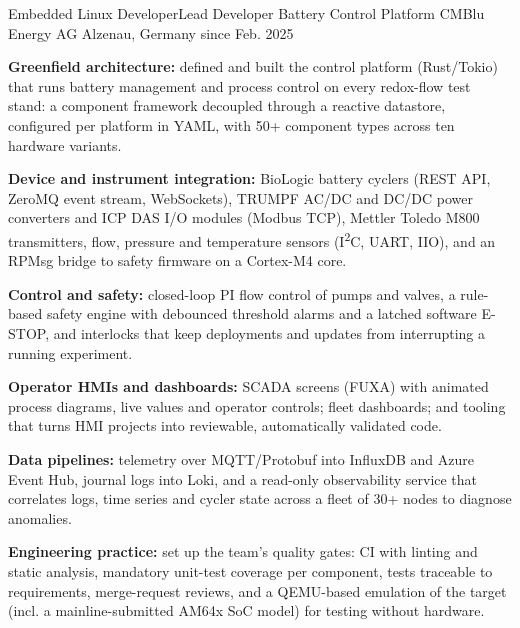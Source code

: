 

\begin{cventries}

  \cventry
    {Embedded Linux Developer{\enskip\cdotp\enskip}Lead Developer Battery Control Platform} %
    {CMBlu Energy AG} %
    {Alzenau, Germany} %
    {since Feb. 2025} %
    {
      \begin{cvitems} %
        \item {\textbf{Greenfield architecture:} defined and built the control platform (Rust/Tokio) that runs battery management and process control on every redox-flow test stand: a component framework decoupled through a reactive datastore, configured per platform in YAML, with 50+ component types across ten hardware variants.}
        \item {\textbf{Device and instrument integration:} BioLogic battery cyclers (REST API, ZeroMQ event stream, WebSockets), TRUMPF AC/DC and DC/DC power converters and ICP DAS I/O modules (Modbus TCP), Mettler Toledo M800 transmitters, flow, pressure and temperature sensors (I\textsuperscript{2}C, UART, IIO), and an RPMsg bridge to safety firmware on a Cortex-M4 core.}
        \item {\textbf{Control and safety:} closed-loop PI flow control of pumps and valves, a rule-based safety engine with debounced threshold alarms and a latched software E-STOP, and interlocks that keep deployments and updates from interrupting a running experiment.}
        \item {\textbf{Operator HMIs and dashboards:} SCADA screens (FUXA) with animated process diagrams, live values and operator controls; fleet dashboards; and tooling that turns HMI projects into reviewable, automatically validated code.}
        \item {\textbf{Data pipelines:} telemetry over MQTT/Protobuf into InfluxDB and Azure Event Hub, journal logs into Loki, and a read-only observability service that correlates logs, time series and cycler state across a fleet of 30+ nodes to diagnose anomalies.}
        \item {\textbf{Engineering practice:} set up the team's quality gates: CI with linting and static analysis, mandatory unit-test coverage per component, tests traceable to requirements, merge-request reviews, and a QEMU-based emulation of the target (incl. a mainline-submitted AM64x SoC model) for testing without hardware.}

\end{cvitems}}
\end{cventries}
